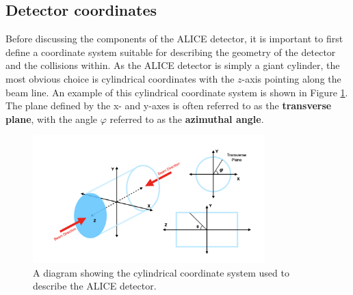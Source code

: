 \subsection{Detector coordinates}
Before discussing the components of the ALICE detector, it is important to first define a coordinate system suitable for describing the geometry of the detector and the collisions within. As the ALICE detector is simply a giant cylinder, the most obvious choice is cylindrical coordinates with the $z$-axis pointing along the beam line. An example of this cylindrical coordinate system is shown in Figure \ref{fig:detector coordinates}. The plane defined by the x- and y-axes is often referred to as the \textbf{transverse plane}, with the angle $\varphi$ referred to as the \textbf{azimuthal angle}.

\begin{figure}
    \centering
    \includegraphics[width=0.8\textwidth]{figures/experiment/detector_coordinates.png}
    \caption{A diagram showing the cylindrical coordinate system used to describe the ALICE detector.}
    \label{fig:detector coordinates}
\end{figure}

